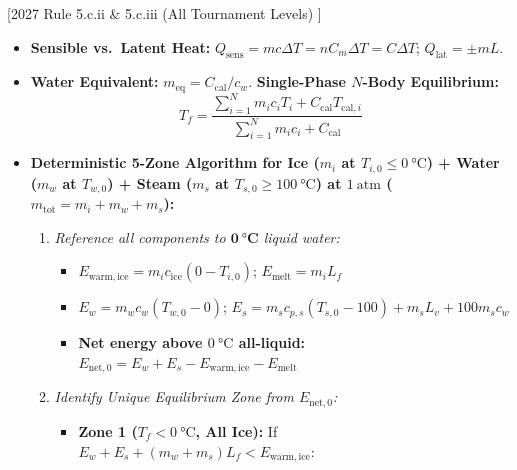 \documentclass[10pt,twoside,openany,letterpaper]{book}
\begin{document}
\begin{quicksheet}\label{qr:04}
[2027 Rule 5.c.ii \& 5.c.iii (All Tournament Levels) ]

\begin{twocol}[0.52]
\begin{formulacard}
\scriptsize
\begin{itemize}
  \item \textbf{Sensible vs.\ Latent Heat:} $Q_{\mathrm{sens}} = mc\Delta T = nC_m\Delta T = C\Delta T$; $Q_{\mathrm{lat}} = \pm mL$.
  \item \textbf{Water Equivalent:} $m_{\mathrm{eq}} = C_{\mathrm{cal}}/c_w$. \textbf{Single-Phase $N$-Body Equilibrium:}
  \[
    T_f = \frac{\sum_{i=1}^N m_i c_i T_i + C_{\mathrm{cal}}T_{\mathrm{cal},i}}{\sum_{i=1}^N m_i c_i + C_{\mathrm{cal}}}
  \]
  \item \textbf{Deterministic 5-Zone Algorithm for Ice ($m_i$ at $T_{i,0}\le\SI{0}{\celsius}$) + Water ($m_w$ at $T_{w,0}$) + Steam ($m_s$ at $T_{s,0}\ge\SI{100}{\celsius}$) at $\SI{1}{\text{atm}}$ ($m_{\mathrm{tot}} = m_i + m_w + m_s$):}
  \begin{enumerate}
    \item \emph{Reference all components to $\mathbf{\SI{0}{\celsius}}$ liquid water:}
    \begin{itemize}
      \item $E_{\mathrm{warm,ice}} = m_i c_{\mathrm{ice}}(0 - T_{i,0})$; \quad $E_{\mathrm{melt}} = m_i L_f$
      \item $E_w = m_w c_w(T_{w,0} - 0)$; \quad $E_s = m_s c_{p,s}(T_{s,0} - 100) + m_s L_v + 100 m_s c_w$
      \item \textbf{Net energy above $\SI{0}{\celsius}$ all-liquid:} $E_{\mathrm{net},0} = E_w + E_s - E_{\mathrm{warm,ice}} - E_{\mathrm{melt}}$
    \end{itemize}
    \item \emph{Identify Unique Equilibrium Zone from $E_{\mathrm{net},0}$:}
    \begin{itemize}
      \item \textbf{Zone 1 ($T_f < \SI{0}{\celsius}$, All Ice):} If $E_w + E_s + (m_w+m_s)L_f < E_{\mathrm{warm,ice}}$:

\end{itemize}
\end{enumerate}
\end{itemize}
\end{formulacard}
\end{twocol}
\end{quicksheet}
\end{document}

